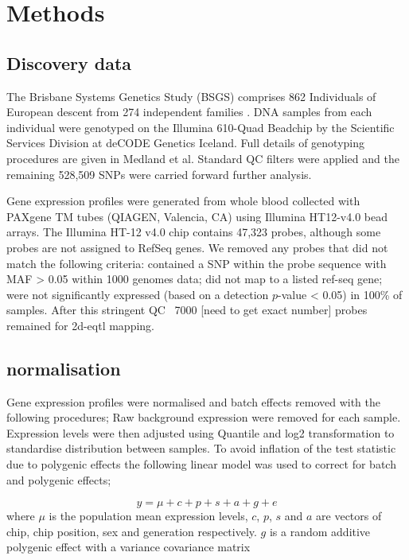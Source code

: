 \documentclass[paper=a4, fontsize=11pt]{scrartcl}	%
\numberwithin{equation}{section}									%
\numberwithin{figure}{section}										%
\numberwithin{table}{section}										%
\begin{document}

\section{Methods}

\subsection{Discovery data}

The Brisbane Systems Genetics Study (BSGS) comprises 862 Individuals of European descent from 274 independent families \cite{pmid22563384}. DNA samples from each individual were genotyped on the Illumina 610-Quad Beadchip by the Scientific Services Division at deCODE Genetics Iceland. Full details of genotyping procedures are given in Medland et al. \cite{Medland2009} Standard QC filters were applied and the remaining 528,509 SNPs were carried forward further analysis. 

Gene expression profiles were generated from whole blood collected with PAXgene TM tubes (QIAGEN, Valencia, CA) using Illumina HT12-v4.0 bead arrays. The Illumina HT-12 v4.0 chip contains 47,323 probes, although some probes are not assigned to RefSeq genes. We removed any probes that did not match the following criteria: contained a SNP within the probe sequence with MAF > 0.05 within 1000 genomes data; did not map to a listed ref-seq gene; were not significantly expressed (based on a detection $p$-value < 0.05) in 100\% of samples. After this stringent QC ~7000 [need to get exact number] probes remained for 2d-eqtl mapping. 

\subsection{normalisation}

Gene expression profiles were normalised and batch effects removed with the following procedures; Raw background expression were removed for each sample. Expression levels were then adjusted using Quantile and log2 transformation to standardise distribution between samples. To avoid inflation of the test statistic due to polygenic effects the following linear model was used to correct for batch and polygenic effects;  

\begin{equation}
y = \mu + c + p + s + a + g + e
\label{eq:lm}
\end{equation}
where $\mu$ is the population mean expression levels, $c$, $p$, $s$ and $a$ are vectors of chip, chip position, sex and generation respectively. $g$ is a random additive polygenic effect with a variance covariance matrix 
\end{document}
